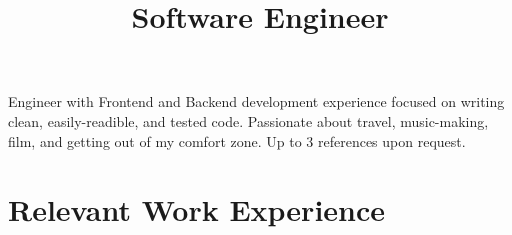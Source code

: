 \documentclass[11pt,a4paper,sans]{moderncv}        %
\title{Software Engineer}                               %
\begin{document}
\makecvtitle

\small{Engineer with Frontend and Backend development experience focused on writing clean, easily-readible, and tested code. Passionate about travel, music-making, film, and getting out of my comfort zone. Up to 3 references upon request.}

\section{Relevant Work Experience}

\vspace{1pt}
\end{document}
